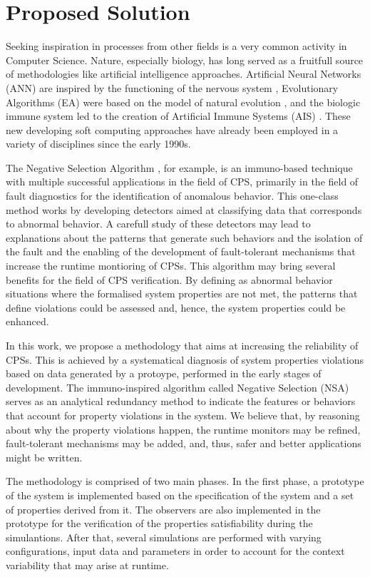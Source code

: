 \section{Proposed Solution}

Seeking inspiration in processes from other fields is a very common activity in Computer Science. Nature, especially biology, has long served as a fruitfull source of methodologies like artificial intelligence approaches. Artificial Neural Networks (ANN) are inspired by the functioning of the nervous system \cite{yegnanarayana2009artificial}, Evolutionary Algorithms (EA) were based on the model of natural evolution \cite{back1993overview}, and the biologic immune system led to the creation of Artificial Immune Systems (AIS) \cite{ICBook2009}. These new developing soft computing approaches have already been employed in a variety of disciplines since the early 1990s. 

The Negative Selection Algorithm \cite{ICBook2009}, for example, is an immuno-based technique with multiple successful applications in the field of CPS, primarily in the field of fault diagnostics for the identification of anomalous behavior. This one-class method works by developing detectors aimed at classifying data that corresponds to abnormal behavior. A carefull study of these detectors may lead to explanations about the patterns that generate such behaviors and the isolation of the fault and the enabling of the development of fault-tolerant mechanisms that increase the runtime montioring of CPSs. This algorithm may bring several benefits for the field of CPS verification. By defining as abnormal behavior situations where the formalised system properties are not met, the patterns that define violations could be assessed and, hence, the system properties could be enhanced. 

In this work, we propose a methodology that aims at increasing the reliability of CPSs. This is achieved by a systematical diagnosis of system properties violations based on data generated by a protoype, performed in the early stages of development. The immuno-inspired algorithm called Negative Selection (NSA) serves as an analytical redundancy method to indicate the features or behaviors that account for property violations in the system. We believe that, by reasoning about why the property violations happen, the runtime monitors may be refined, fault-tolerant mechanisms may be added, and, thus, safer and better applications might be written.

The methodology is comprised of two main phases. In the first phase, a prototype of the system is implemented based on the specification of the system and a set of properties derived from it. The observers are also implemented in the prototype for the verification of the properties satisfiability during the simulantions. After that, several simulations are performed with varying configurations, input data and parameters in order to account for the context variability that may arise at runtime. 


